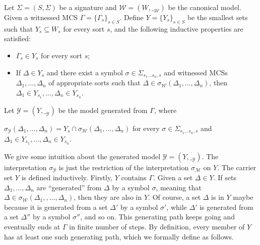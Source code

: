 \documentclass[acmsmall]{acmart}
\theoremstyle{acmdefinition}
\newcommand{\sig}{\mathbb{\Sigma}}
\newcommand{\MM}{\mathcal{M}}
\newcommand{\WW}{\mathcal{W}}
\newcommand{\YY}{\mathcal{Y}}
\newcommand{\interp}[1]{\__{#1}}
\newcommand{\sigmaM}{{\sigma_{\MM}}}
\newcommand{\sigmaW}{{\sigma_{\WW}}}
\newcommand{\sigmaY}{{\sigma_{\YY}}}
\newcommand{\ddd}{,\dots,}
\newcommand{\sigmaMGammaoc}{\sigma_\WW}
\newcommand{\SigmaSub}[1]{\Sigma_{#1}}
\begin{document}
\begin{definition}
\label{def_generated_models}
Let $\sig = (S,\Sigma)$ be a signature and
$\WW = (W,\__\WW)$ be the canonical model.
Given a witnessed MCS $\Gamma = \{ \Gamma_s \}_{s \in S}$.
Define $Y = \{Y_s\}_{s \in S}$ 
be the smallest sets such that
$Y_s \subseteq W_s$ for every sort $s$, and
the following inductive properties are satisfied:
\begin{itemize}
\item $\Gamma_s \in Y_s$ for every sort $s$;
\item If $\Delta \in Y_s$
      and there exist a symbol 
      $\sigma \in \SigmaSub{s_1 \dots s_n, s}$ and 
      witnessed MCSs $\Delta_1 \ddd \Delta_n$ of appropriate sorts
      such that
      $\Delta \in \sigmaMGammaoc(\Delta_1,\dots,\Delta_n)$,
      then $\Delta_1 \in Y_{s_1} \ddd \Delta_n \in Y_{s_n}$. 
\end{itemize}
Let $\YY = (Y, \interp{\YY})$ 
be the model generated from $\Gamma$, where
\begin{center}
$\sigmaY (\Delta_1 \ddd \Delta_n) =
  Y_s \cap \sigmaW(\Delta_1 \ddd \Delta_n)$
\quad for every $\sigma \in \SigmaSub{s_1 \dots s_n, s}$ and
      $\Delta_1 \in Y_{s_1} \ddd \Delta_n \in Y_{s_n}$.
\end{center}
\end{definition}

We give some intuition about the generated model $\YY = (Y, \interp{\YY})$.
The interpretation $\sigmaY$ is just the restriction of 
the interpretation $\sigmaM$ on $Y$.
The carrier set $Y$ is defined inductively.
Firstly, $Y$ contains $\Gamma$.
Given a set $\Delta \in Y$.
If sets
$\Delta_1 \ddd \Delta_n$ 
are ``generated'' from $\Delta$ by a symbol $\sigma$,
meaning that 
$\Delta \in \sigmaW(\Delta_1, \ddd \Delta_n)$,
then they are also in $Y$.
Of course, a set $\Delta$ is in $Y$
maybe because it is generated
from a set $\Delta'$ by a symbol $\sigma'$,
while $\Delta'$ is generated 
from a set $\Delta''$ by a symbol $\sigma''$, and so on.
This generating path keeps going
and eventually ends at $\Gamma$ in finite number of steps.
By definition, every member of $Y$ has at least one such generating path,
which we formally define as follows.
\end{document}
